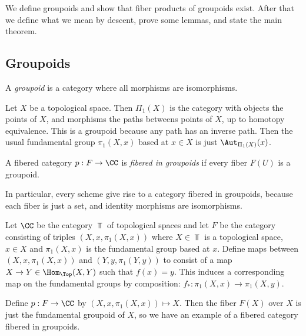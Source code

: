 \documentclass[11pt, english]{article}
\begin{document}
We define groupoids and show that fiber products of groupoids exist. After that we define what we mean by descent, prove some lemmas, and state the main theorem.

\subsection{Groupoids}

\begin{defi}
A \emph{groupoid} is a category where all morphisms are isomorphisms.
\end{defi}

\begin{example} Let $X$ be a topological space. Then $\Pi_1(X)$ is the category with objects the points of $X$, and morphisms the paths betweens points of $X$, up to homotopy equivalence. This is a groupoid because any path has an inverse path. Then the usual fundamental group $\pi_1(X,x)$ based at $x \in X$ is just $\Aut_{\Pi_1(X)}(x)$.
\end{example}

\begin{defi}
A fibered category $p:F \to \CC$ is \emph{fibered in groupoids} if every fiber $F(U)$ is a groupoid.
\end{defi}
\begin{remark}
In particular, every scheme give rise to a category fibered in groupoids, because each fiber is just a set, and identity morphisms are isomorphisms.
\end{remark}

\begin{example}
Let $\CC$ be the category $\Top$ of topological spaces and let $F$ be the category consisting of triples $(X,x,\pi_1(X,x))$ where $X \in \Top$ is a topological space, $x \in X$ and $\pi_1(X,x)$ is the fundamental group based at $x$. Define maps between $(X,x,\pi_1(X,x))$ and $(Y,y,\pi_1(Y,y))$ to consist of a map $X \to Y \in \Hom_\Top(X,Y)$ such that $f(x)=y$. This induces a corresponding map on the fundamental groups by composition: $f_*:\pi_1(X,x) \to \pi_1(X,y)$.

Define $p: F \to \CC$ by $(X,x, \pi_1(X,x)) \mapsto X$. Then the fiber $F(X)$ over $X$ is just the fundamental groupoid of $X$, so we have an example of a fibered category fibered in groupoids.
\end{example}
\end{document}
